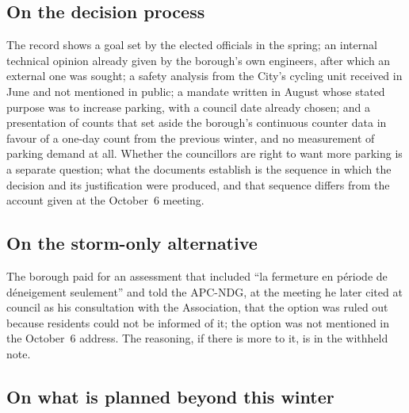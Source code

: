 \documentclass[11pt,letterpaper]{article}
\begin{document}
\subsection{On the decision process}

The record shows a goal set by the elected officials in the spring; an
internal technical opinion already given by the borough's own engineers,
after which an external one was sought; a safety analysis from the City's
cycling unit received in June and not mentioned in public; a mandate written
in August whose stated purpose was to increase parking, with a council date
already chosen; and a presentation of counts that set aside the borough's
continuous counter data in favour of a one-day count from the previous
winter, and no measurement of parking demand at all. Whether the councillors are right to want more parking is a
separate question; what the documents establish is the sequence in which
the decision and its justification were produced, and that sequence differs
from the account given at the October~6 meeting.

\subsection{On the storm-only alternative}

The borough paid for an assessment that included ``la fermeture en
p\'eriode de d\'eneigement seulement'' and told the APC-NDG, at the meeting
he later cited at council as his consultation with the Association, that
the option was ruled out because residents could not be informed of it; the
option was not mentioned in the October~6 address. The reasoning, if there
is more to it, is in the withheld note.

\subsection{On what is planned beyond this winter}
\end{document}
